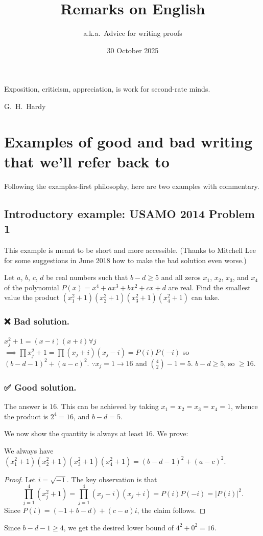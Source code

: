 \documentclass[11pt]{scrartcl}
\begin{document}
\title{Remarks on English}
\subtitle{a.k.a.\ Advice for writing proofs}
\date{30 October 2025}
\maketitle

\epigraph{Exposition, criticism, appreciation, is work for second-rate minds.}
{G.\ H.\ Hardy}

\tableofcontents
\newpage

\section{Examples of good and bad writing that we'll refer back to}
\label{sec:examples}
Following the examples-first philosophy, here are two examples with commentary.

\subsection{Introductory example: USAMO 2014 Problem 1}
This example is meant to be short and more accessible.
(Thanks to Mitchell Lee for some suggestions in June 2018 how to make the
bad solution even worse.)

\begin{example}
  [USAMO 2014/1]
  Let $a$, $b$, $c$, $d$ be real numbers such that $b-d \ge 5$ and all zeros
  $x_1$, $x_2$, $x_3$, and $x_4$ of the polynomial $P(x)=x^4+ax^3+bx^2+cx+d$ are real.
  Find the smallest value the product $(x_1^2+1)(x_2^2+1)(x_3^2+1)(x_4^2+1)$ can take.
\end{example}

\subsubsection*{❌ Bad solution.}
$x_j^2+1 = (x-i)(x+i) \forall j$
$\implies \prod x_j^2+1 = \prod (x_j+i)(x_j-i) = P(i)P(-i)$
so $(b-d-1)^2 + (a-c)^2$.
$\because x_j = 1 \rightarrow 16$ and $\binom42-1 = 5$.
$b-d \ge 5$, so $\ge 16$.

\subsubsection*{✅ Good solution.}
The answer is $\boxed{16}$.
This can be achieved by taking $x_1 = x_2 = x_3 = x_4 = 1$,
whence the product is $2^4 = 16$, and $b-d = 5$.

We now show the quantity is always at least $16$.
We prove:
\begin{claim*}
  We always have $(x_1^2+1)(x_2^2+1)(x_3^2+1)(x_4^2+1) = (b-d-1)^2 + (a-c)^2$.
\end{claim*}
\begin{proof}
  Let $i = \sqrt{-1}$.
  The key observation is that
  \[ \prod_{j=1}^4 \left( x_j^2 + 1 \right)
    = \prod_{j=1}^4 (x_j - i)(x_j + i)
    = P(i)P(-i) = |P(i)|^2. \]
  Since $P(i) = (-1+b-d) + (c-a)i$, the claim follows.
\end{proof}
Since $b-d-1 \ge 4$, we get the desired lower bound of $4^2+0^2=16$.
\end{document}
